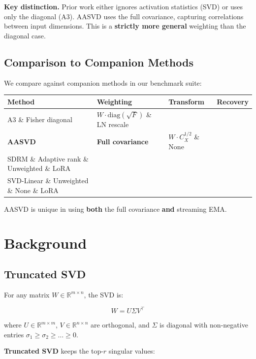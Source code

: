 \textbf{Key distinction.} Prior work either ignores activation statistics (SVD) 
or uses only the diagonal (A3). AASVD uses the full covariance, capturing 
correlations between input dimensions. This is a \textbf{strictly more general} 
weighting than the diagonal case.

\subsection{Comparison to Companion Methods}

We compare against companion methods in our benchmark suite:

\begin{table}[H]
\centering
\small
\begin{tabular}{llll}
\toprule
\textbf{Method} & \textbf{Weighting} & \textbf{Transform} & \textbf{Recovery} \\
\midrule
A3 \& Fisher diagonal & $W \cdot \mathrm{diag}(\sqrt{F})$ \& LN rescale \\
\textbf{AASVD} & \textbf{Full covariance} & $W \cdot C_X^{1/2}$ \& None \\
SDRM \& Adaptive rank \& Unweighted \& LoRA \\
SVD-Linear \& Unweighted \& None \& LoRA \\
\bottomrule
\end{tabular}
\end{table}

AASVD is unique in using \textbf{both} the full covariance \textbf{and} streaming EMA.


\section{Background}

\subsection{Truncated SVD}

For any matrix $W \in \mathbb{R}^{m \times n}$, the SVD is:

\[
W = U \Sigma V^\top
\tag{3.1}
\]

where $U \in \mathbb{R}^{m \times m}$, $V \in \mathbb{R}^{n \times n}$ are 
orthogonal, and $\Sigma$ is diagonal with non-negative entries 
$\sigma_1 \geq \sigma_2 \geq \dots \geq 0$.

\textbf{Truncated SVD} keeps the top-$r$ singular values:


